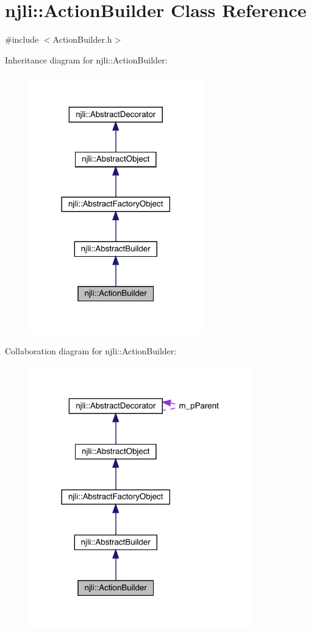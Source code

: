 \hypertarget{classnjli_1_1_action_builder}{}\section{njli\+:\+:Action\+Builder Class Reference}
\label{classnjli_1_1_action_builder}


{\ttfamily \#include $<$Action\+Builder.\+h$>$}



Inheritance diagram for njli\+:\+:Action\+Builder\+:\nopagebreak
\begin{figure}[H]
\begin{center}
\leavevmode
\includegraphics[width=213pt]{classnjli_1_1_action_builder__inherit__graph}
\end{center}
\end{figure}


Collaboration diagram for njli\+:\+:Action\+Builder\+:\nopagebreak
\begin{figure}[H]
\begin{center}
\leavevmode
\includegraphics[width=273pt]{classnjli_1_1_action_builder__coll__graph}
\end{center}
\end{figure}
